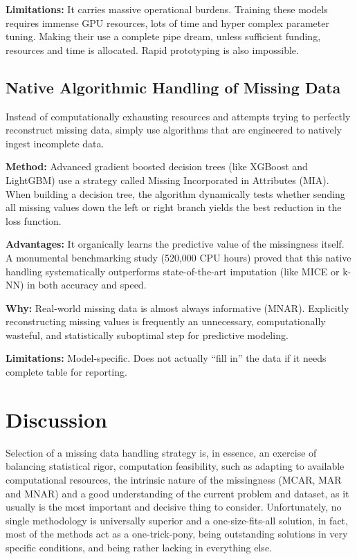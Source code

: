 \documentclass[journal]{IEEEtran}
\begin{document}
\noindent \textbf{Limitations:} It carries massive operational burdens. Training these models requires immense GPU resources, lots of time and hyper complex parameter tuning. Making their use a complete pipe dream, unless sufficient funding, resources and time is allocated. Rapid prototyping is also impossible.

\subsection{Native Algorithmic Handling of Missing Data}

\noindent Instead of computationally exhausting resources and attempts trying to perfectly reconstruct missing data, simply use algorithms that are engineered to natively ingest incomplete data.

\noindent \textbf{Method:} Advanced gradient boosted decision trees (like XGBoost and LightGBM) use a strategy called Missing Incorporated in Attributes (MIA). When building a decision tree, the algorithm dynamically tests whether sending all missing values down the left or right branch yields the best reduction in the loss function.

\noindent \textbf{Advantages:} It organically learns the predictive value of the missingness itself. A monumental benchmarking study (520,000 CPU hours) \cite{lemorvan2022benchmarking} proved that this native handling systematically outperforms state-of-the-art imputation (like MICE or k-NN) in both accuracy and speed.

\noindent \textbf{Why:} Real-world missing data is almost always informative (MNAR). Explicitly reconstructing missing values is frequently an unnecessary, computationally wasteful, and statistically suboptimal step for predictive modeling.

\noindent \textbf{Limitations:} Model-specific. Does not actually ``fill in'' the data if it needs complete table for reporting.


\section{Discussion}
Selection of a missing data handling strategy is, in essence, an exercise of balancing statistical rigor, computation feasibility, such as adapting to available computational resources, the intrinsic nature of the missingness (MCAR, MAR and MNAR) and a good understanding of the current problem and dataset, as it usually is the most important and decisive thing to consider. Unfortunately, no single methodology is universally superior and a one-size-fits-all solution, in fact, most of the methods act as a one-trick-pony, being outstanding solutions in very specific conditions, and being rather lacking in everything else.
\end{document}
